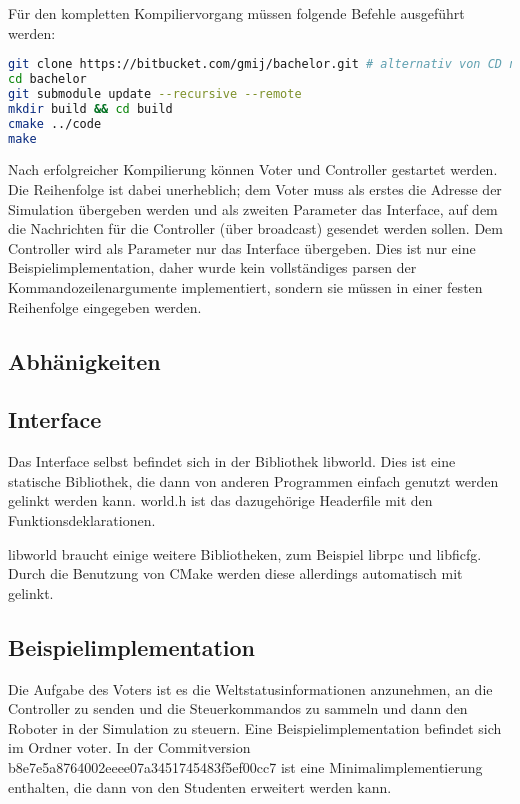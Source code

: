 \documentclass[
    12pt,
    bibliography=totoc,
    ngerman,
    enabledeprecatedfontcommands
]{scrartcl}
\begin{document}
F{\"{u}}r den kompletten Kompiliervorgang m{\"{u}}ssen folgende Befehle ausgef{\"{u}}hrt werden:
\begin{lstlisting}[frame=single, language=Bash] 
git clone https://bitbucket.com/gmij/bachelor.git # alternativ von CD nehmen
cd bachelor
git submodule update --recursive --remote
mkdir build && cd build
cmake ../code
make
\end{lstlisting}

Nach erfolgreicher Kompilierung k{\"{o}}nnen Voter und Controller gestartet werden. Die Reihenfolge ist dabei unerheblich; dem Voter muss als erstes die Adresse der Simulation
{\"{u}}bergeben werden und als zweiten Parameter das Interface, auf dem die Nachrichten f{\"{u}}r die Controller ({\"{u}}ber broadcast) gesendet werden sollen. Dem Controller
wird als Parameter nur das Interface {\"{u}}bergeben. Dies ist nur eine Beispielimplementation, daher wurde kein vollst{\"{a}}ndiges parsen der Kommandozeilenargumente
implementiert, sondern sie m{\"{u}}ssen in einer festen Reihenfolge eingegeben werden.

\subsection{Abh{\"{a}}nigkeiten}
\todo{}

\subsection{Interface}
Das Interface selbst befindet sich in der Bibliothek libworld. Dies ist eine statische Bibliothek, die dann von anderen Programmen einfach genutzt werden
gelinkt werden kann. world.h ist das dazugeh{\"{o}}rige Headerfile mit den Funktionsdeklarationen.

libworld braucht einige weitere Bibliotheken, zum Beispiel librpc und libficfg. Durch die Benutzung von CMake werden diese allerdings automatisch mit gelinkt.

\subsection{Beispielimplementation}
Die Aufgabe des Voters ist es die Weltstatusinformationen anzunehmen, an die Controller zu senden und die Steuerkommandos zu sammeln und dann den Roboter in
der Simulation zu steuern. Eine Beispielimplementation befindet sich im Ordner voter. In der Commitversion b8e7e5a8764002eeee07a3451745483f5ef00cc7 ist eine
Minimalimplementierung enthalten, die dann von den Studenten erweitert werden kann.
\end{document}
